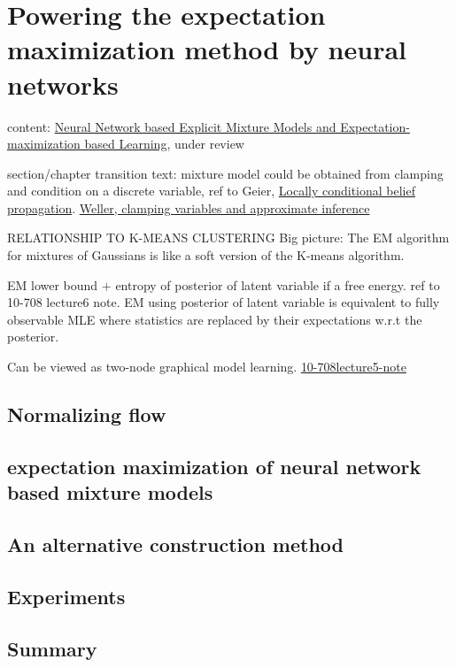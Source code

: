 \chapter{Powering the expectation maximization method by neural networks}
content: \href{https://arxiv.org/abs/1907.13432}{Neural Network based Explicit Mixture Models and Expectation-maximization based Learning}, under review

section/chapter transition text: mixture model could be obtained from clamping and condition on a discrete variable, ref to Geier, \href{http://auai.org/uai2015/proceedings/papers/158.pdf}{Locally conditional belief propagation}. \href{https://papers.nips.cc/paper/5529-clamping-variables-and-approximate-inference.pdf}{Weller, clamping variables and approximate inference}

\begin{remark}
  RELATIONSHIP TO K-MEANS CLUSTERING
  Big picture: The EM algorithm for mixtures of Gaussians is like a soft version of the K-means algorithm.
\end{remark}

\begin{remark}
  EM lower bound $+$ entropy of posterior of latent variable if a free energy. ref to 10-708 lecture6 note.
  EM using posterior of latent variable is equivalent to fully observable MLE where statistics are replaced by their expectations w.r.t the posterior.
\end{remark}

Can be viewed as two-node graphical model learning. \href{https://sailinglab.github.io/pgm-spring-2019/notes/lecture-05/}{10-708lecture5-note}
\section{Normalizing flow}

\section{expectation maximization of neural network based mixture models}

\section{An alternative construction method}

\section{Experiments}


\section{Summary}

